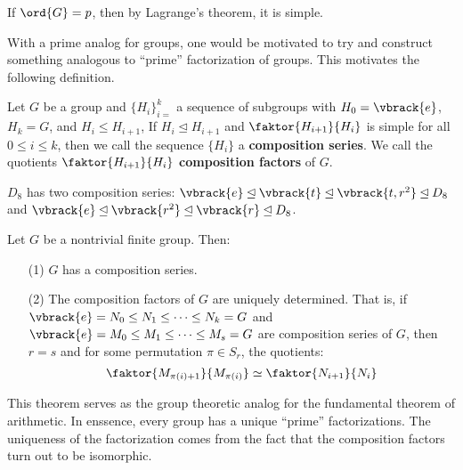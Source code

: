 \begin{example}\label{3.8}
    If $\ord{G}=p$, then by Lagrange's theorem, it is simple.
\end{example}

With a prime analog for groups, one would be motivated to try and construct
something analogous to ``prime'' factorization of groups. This motivates the
following definition.

\begin{definition}
    Let $G$ be a group and $\{H_i\}_{i=}^k$ a sequence of subgroups with
    $H_0=\vbrack{e}$, $H_k=G$, and  $H_i \leq H_{i+1}$, If $H_i \unlhd H_{i+1}$
    and $\faktor{H_{i+1}}{H_i}$ is simple for all $0 \leq i \leq k$, then we
    call the sequence  $\{H_i\}$ a \textbf{composition series}. We call the
    quotients $\faktor{H_{i+1}}{H_i}$ \textbf{composition factors} of $G$.
\end{definition}

\begin{example}\label{3.9}
    $D_8$ has two composition series: $\vbrack{e} \unlhd \vbrack{t} \unlhd
    \vbrack{t,r^2} \unlhd D_8$ and $\vbrack{e} \unlhd \vbrack{r^2} \unlhd
    \vbrack{r} \unlhd D_8$.
\end{example}

\begin{theorem}\label{3.5.2}
    Let $G$ be a nontrivial finite group. Then:
    \begin{enumerate}
        \item[(1)] $G$ has a composition series.

        \item[(2)] The composition factors of  $G$ are uniquely determined. That
            is, if $\vbrack{e}=N_0 \leq N_1 \leq \dots \leq N_k=G$ and
            $\vbrack{e}=M_0 \leq M_1 \leq \dots \leq M_s=G$ are composition
            series of $G$, then  $r=s$ and for some permutation  $\pi \in S_r$,
            the quotients:
            \begin{equation*}
                \faktor{M_{\pi(i)+1}}{M_{\pi(i)}} \simeq \faktor{N_{i+1}}{N_i}
            \end{equation*}
    \end{enumerate}
\end{theorem}
\begin{remark}
    This theorem serves as the group theoretic analog for the fundamental theorem of
    arithmetic. In enssence, every group has a unique ``prime'' factorizations.
    The uniqueness of the factorization comes from the fact that the composition
    factors turn out to be isomorphic.
\end{remark}

